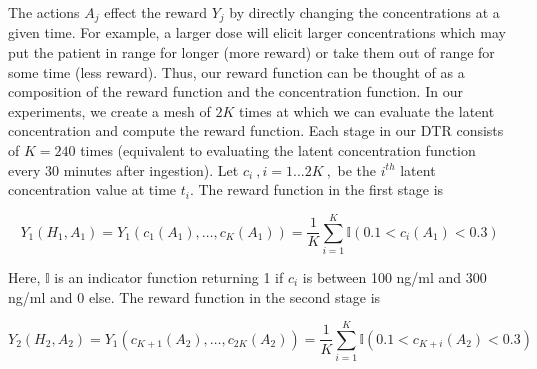 The actions $A_j$ effect the reward $Y_j$ by directly changing the concentrations at a given time.  For example, a larger dose will elicit larger concentrations which may put the patient in range for longer (more reward) or  take them out of range for some time (less reward).  Thus, our reward function can be thought of as a composition of the reward function and the concentration function.  In our experiments, we create a mesh of $2K$ times at which we can evaluate the latent concentration and compute the reward function.  Each stage in our DTR consists of $K=240$ times (equivalent to evaluating the latent concentration function every 30 minutes after ingestion).  Let $ c_i \>,  i=1...2K \>, $ be the $ i^{th}$ latent concentration value at time $ t_i $.  The reward function in the first stage is

\begin{equation}
Y_1(H_1, A_1) = Y_1(c_1(A_1), \dots, c_K(A_1)) = \dfrac{1}{K}\sum_{i=1}^K \mathbb{I}(0.1 < c_i(A_1) < 0.3)
\end{equation}



\noindent Here, $ \mathbb{I} $ is an indicator function returning 1 if $c_i$ is between 100 ng/ml and 300 ng/ml and 0 else.
%
\noindent The reward function in the second stage is

\begin{equation}
Y_2(H_2, A_2) = Y_1(c_{K+1}(A_2), \dots, c_{2K}(A_2)) = \dfrac{1}{K}\sum_{i=1}^K \mathbb{I}(0.1 < c_{K+i}(A_2) < 0.3)
\end{equation}



